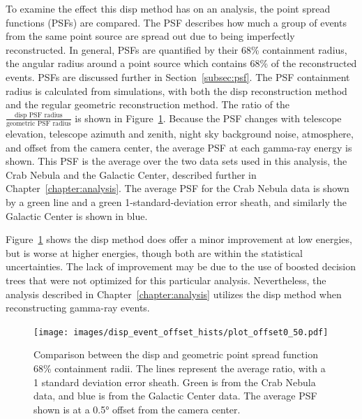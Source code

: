 To examine the effect this disp method has on an analysis, the point spread functions (PSFs) are compared.
The PSF describes how much a group of events from the same point source are spread out due to being imperfectly reconstructed.
In general, PSFs are quantified by their 68\% containment radius, the angular radius around a point source which contains 68\% of the reconstructed events.
PSFs are discussed further in Section~\ref{subsec:psf}.
The PSF containment radius is calculated from simulations, with both the disp reconstruction method and the regular geometric reconstruction method.
The ratio of the $\frac{\textrm{disp PSF radius}}{\textrm{geometric PSF radius}}$ is shown in Figure~\ref{fig:disp_psf_comparison}.
Because the PSF changes with telescope elevation, telescope azimuth and zenith, night sky background noise, atmosphere, and offset from the camera center, the average PSF at each gamma-ray energy is shown.
This PSF is the average over the two data sets used in this analysis, the Crab Nebula and the Galactic Center, described further in Chapter~\ref{chapter:analysis}.
The average PSF for the Crab Nebula data is shown by a green line and a green 1-standard-deviation error sheath, and similarly the Galactic Center is shown in blue.
    
Figure~\ref{fig:disp_psf_comparison} shows the disp method does offer a minor improvement at low energies, but is worse at higher energies, though both are within the statistical uncertainties.
The lack of improvement may be due to the use of boosted decision trees that were not optimized for this particular analysis.
Nevertheless, the analysis described in Chapter~\ref{chapter:analysis} utilizes the disp method when reconstructing gamma-ray events.
    
\begin{figure}[b]
  \centering
  \texttt{[image: images/disp\_event\_offset\_hists/plot\_offset0\_50.pdf]}
  \caption[DISP Point Spread Function Comparison]{
    Comparison between the disp and geometric point spread function 68\% containment radii.
    The lines represent the average ratio, with a 1 standard deviation error sheath.
    Green is from the Crab Nebula data, and blue is from the Galactic Center data.
    The average PSF shown is at a \ang{0.5} offset from the camera center.
  }
  \label{fig:disp_psf_comparison}
\end{figure}

